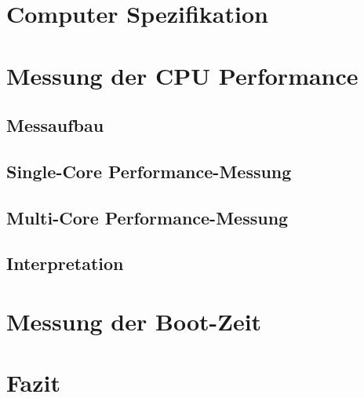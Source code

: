 \documentclass[conference]{IEEEtran}
\begin{document}
\section{Computer Spezifikation}
\label{Computer Spezifikation}

\section{Messung der CPU Performance}
\label{Messung der CPU Performance}

\subsection{Messaufbau}

\subsection{Single-Core Performance-Messung}

\subsection{Multi-Core Performance-Messung}

\subsection{Interpretation}

\section{Messung der Boot-Zeit}
\label{Messung der CPU Performance}

\section{Fazit}
\label{Fazit}



\end{document}
